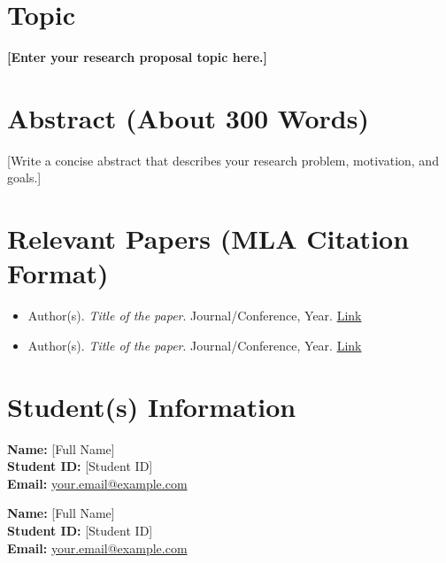 \documentclass[11pt]{article}
\begin{document}
\thispagestyle{header} %

\vspace{0.5cm}

\section*{\color{DarkBlue}Topic}
\vspace{0.2cm}
\noindent
\textbf{[Enter your research proposal topic here.]}

\vspace{0.8cm}

\section*{\color{DarkBlue}Abstract (About 300 Words)}
\vspace{0.2cm}
\noindent
[Write a concise abstract that describes your research problem, motivation, and goals.]

\vspace{0.8cm}

\section*{\color{DarkBlue}Relevant Papers (MLA Citation Format)}
\vspace{0.2cm}
\begin{itemize}
    \item Author(s). \textit{Title of the paper}. Journal/Conference, Year. \href{URL}{Link}
    \item Author(s). \textit{Title of the paper}. Journal/Conference, Year. \href{URL}{Link}
\end{itemize}

\vspace{0.8cm}

\section*{\color{DarkBlue}Student(s) Information}
\vspace{0.2cm}
\noindent
\textbf{Name:} [Full Name] \\
\textbf{Student ID:} [Student ID] \\
\textbf{Email:} \href{mailto:your.email@example.com}{your.email@example.com}

\textbf{Name:} [Full Name] \\
\textbf{Student ID:} [Student ID] \\
\textbf{Email:} \href{mailto:your.email@example.com}{your.email@example.com}
\end{document}
